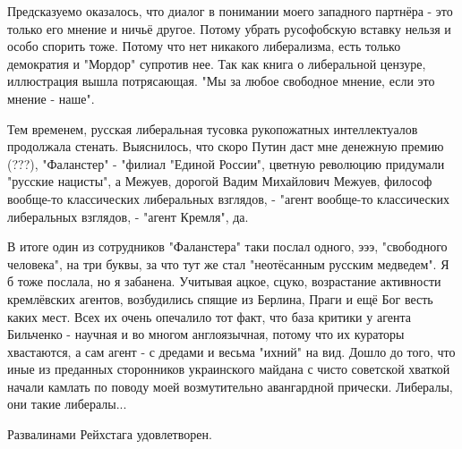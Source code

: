 Предсказуемо оказалось, что диалог в понимании моего западного партнёра - это
только его мнение и ничьё другое. Потому убрать русофобскую вставку нельзя и
особо спорить тоже. Потому что нет никакого либерализма, есть только демократия
и "Мордор" супротив нее. Так как книга о либеральной цензуре, иллюстрация вышла
потрясающая. "Мы за любое свободное мнение, если это мнение - наше".

Тем временем, русская либеральная тусовка рукопожатных интеллектуалов
продолжала стенать. Выяснилось, что скоро Путин даст мне денежную премию (???),
"Фаланстер" - "филиал "Единой России", цветную революцию придумали "русские
нацисты", а Межуев, дорогой Вадим Михайлович Межуев, философ вообще-то
классических либеральных взглядов, - "агент вообще-то классических либеральных
взглядов, - "агент Кремля", да.

В итоге один из сотрудников "Фаланстера" таки послал одного, эээ, "свободного
человека", на три буквы, за что тут же стал "неотёсанным русским медведем". Я б
тоже послала, но я забанена. Учитывая ацкое, сцуко, возрастание активности
кремлёвских агентов, возбудились спящие из Берлина, Праги и ещё Бог весть каких
мест. Всех их очень опечалило тот факт, что база критики у агента Бильченко -
научная и во многом англоязычная, потому что их кураторы хвастаются, а сам
агент - с дредами и весьма "ихний" на вид. Дошло до того, что иные из преданных
сторонников украинского майдана с чисто советской хваткой начали камлать по
поводу моей возмутительно авангардной прически. Либералы, они такие либералы...

Развалинами Рейхстага удовлетворен.
